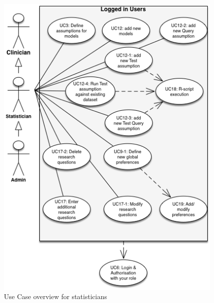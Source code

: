 \begin{figure}[!ht]
\centering
\includegraphics[width=\textwidth]{figures/use_case_statistician}
\caption{Use Case overview for statisticians}
\label{fig:usecase:statistician}
\end{figure}


